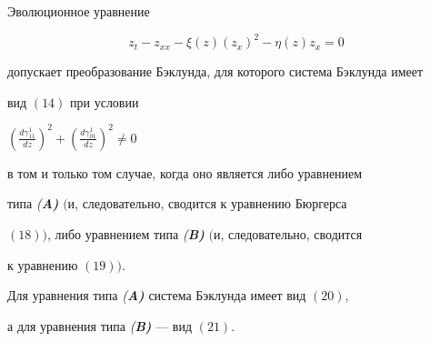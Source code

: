 \begin{thms}


Эволюционное уравнение


$$


z_t-z_{xx}-\xi (z) ({z_x})^2-\eta (z) z_x=0


$$


допускает преобразование Бэклунда, для которого система Бэклунда имеет 


вид $(14)$ при условии


$({\frac{{d\gamma_{11}^1}}{{dz}}})^2 +


({\frac{{d\gamma_{01}^1}}{{dz}}})^2 \ne 0$


в том и только том случае, когда оно является либо уравнением 


типа {\em (\bf A)} $($и, следовательно, сводится к уравнению Бюргерса


$(18))$, либо уравнением типа {\em (\bf B)} $($и, следовательно, сводится 


к уравнению $(19))$.


Для уравнения типа {\em (\bf A)} система Бэклунда имеет вид $(20)$,


а для уравнения типа {\em (\bf B)} --- вид $(21)$.


\end{thms}












